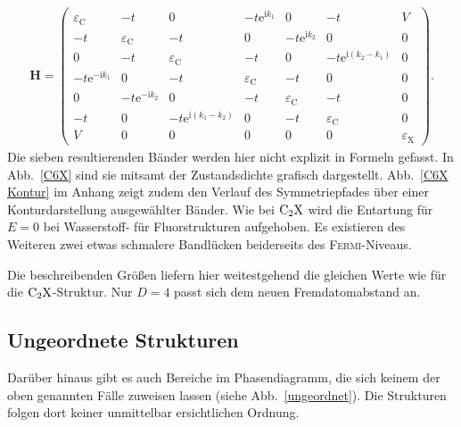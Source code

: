 \documentclass[a4paper, 10pt, twoside, openany]{book} %
\def \I {\mathrm i}
\def \E {\mathrm e}
\def \vec {\boldsymbol}
\def \eC {\varepsilon_\mathrm{C}}
\def \eX {\varepsilon_\mathrm{X}}
\begin{document}
	\begin{align*}
		\vec H =
		\begin{pmatrix}
	        \eC             & -t              &  0                     & -t \E^{\I k_1} &  0             & -t                     &  V \\
	        -t              & \eC             & -t                     &  0             & -t \E^{\I k_2} &  0                     &  0 \\
	         0              & -t              & \eC                    & -t             &  0             & -t \E^{\I (k_2 - k_1)} &  0 \\
	        -t \E^{-\I k_1} &  0              & -t                     & \eC            & -t             &  0                     &  0 \\
	         0              & -t \E^{-\I k_2} &  0                     & -t             & \eC            & -t                     &  0 \\
	        -t              &  0              & -t \E^{\I (k_1 - k_2)} &  0             & -t             & \eC                    &  0 \\
	         V              &  0              &  0                     &  0             &  0             &  0                     & \eX
		\end{pmatrix}.
	\end{align*}
	Die sieben resultierenden Bänder werden hier nicht explizit in Formeln gefasst. In Abb.~\ref{C6X} sind sie mitsamt der Zustandsdichte grafisch dargestellt. Abb.~\ref{C6X Kontur} im Anhang zeigt zudem den Verlauf des Symmetriepfades über einer Konturdarstellung ausgewählter Bänder. Wie bei $\rm C_2X$ wird die Entartung für $E = 0$ bei Wasserstoff- für Fluorstrukturen aufgehoben. Es existieren des Weiteren zwei etwas schmalere Bandlücken beiderseits des \textsc{Fermi}-Niveaus.
	
	Die beschreibenden Größen liefern hier weitestgehend die gleichen Werte wie für die $\rm C_2X$-Struktur. Nur $D = 4$ passt sich dem neuen Fremdatomabstand an.
	
	\subsection{Ungeordnete Strukturen}
	
	Darüber hinaus gibt es auch Bereiche im Phasendiagramm, die sich keinem der oben genannten Fälle zuweisen lassen (siehe Abb.~\ref{ungeordnet}). Die Strukturen folgen dort keiner unmittelbar ersichtlichen Ordnung.
	
\end{document}
